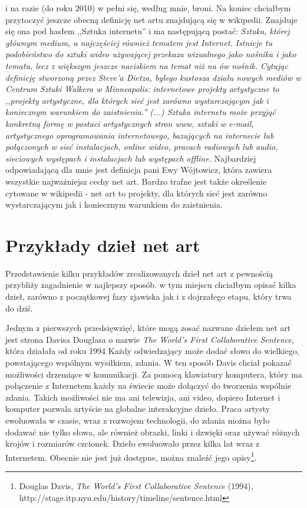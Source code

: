 \documentclass[a4paper,12pt]{article}
\begin{document}
i na razie (do roku 2010) w pełni się, według mnie, broni.
Na koniec chciałbym przytoczyć jeszcze obecną definicję net artu znajdującą
się w wikipedii. Znajduje się ona pod hasłem ,,Sztuka internetu'' i ma
następującą postać: %
\textit{Sztuka, której głównym
medium, a najczęściej również tematem jest Internet. Istnieje tu podobieństwo
do sztuki wideo używającej przekazu wizualnego jako nośnika i jako tematu,
lecz z większym jeszcze naciskiem na temat niż na ów nośnik. Cytując definicję
stworzoną przez Steve'a Dietza, byłego kustosza działu nowych mediów
w Centrum Sztuki Walkera w Minneapolis: internetowe projekty artystyczne
to ,,projekty artystyczne, dla których sieć jest zarówno wystarczającym
jak i koniecznym warunkiem do zaistnienia.'' (...) Sztuka internetu może
przyjąć konkretną formę w postaci artystycznych stron www, sztuki w e-mail,
artystycznego oprogramowania internetowego, bazujących na internecie lub
połączonych w sieć instalacjach, online wideo, pracach radiowych lub audio,
sieciowych występach i instalacjach lub występach offline.}
Najbardziej odpowiadającą dla mnie jest definicja pani Ewy Wójtowicz,
która zawiera wszystkie najważniejsz cechy net art. Bardzo trafne jest
także określenie cytowane w wikipedii - net art to projekty, dla których
sieć jest zarówno wystarczającym jak i koniecznym warunkiem do zaistnienia.

\section{Przykłady dzieł net art}

Przedstawienie kilku przykładów zrealizowanych dzieł net art z pewnością
przybliży zagadnienie w najlepszy sposób. w tym miejscu chciałbym
opisać kilka dzieł, zarówno z początkowej fazy zjawiska jak i z dojrzałego
etapu, który trwa do dziś.

Jednym z pierwszych przedsięwzięć,
które mogą zosać nazwane dziełem net art jest strona Davisa Douglasa
o nazwie \textit{The World's First Collaborative Sentence}, która działała
od roku 1994
Każdy odwiedzający może dodać słowo do wielkiego,
powstającego wspólnym wysiłkiem, zdania. W ten sposób Davis chciał
pokazać możliwości drzemiące w komunikacji. Za pomocą klawiatury
komputera, który ma połączenie z Internetem każdy na świecie może
dołączyć do tworzenia wspólnie zdania. Takich możliwości nie ma
ani telewizja, ani video, dopiero Internet i komputer pozwala artyście
na globalne interakcyjne dzieło. Praca artysty ewoluowała w czasie,
wraz z rozwojem technologii, do zdania można było dodawać nie tylko
słowa, ale również obrazki, linki i dzwięki oraz używać różnych krojów
i rozmiarów czcionek. Dzieło ewoluowało przez kilka lat wraz z Internetem.
Obecnie nie jest już dostępne, można znaleźć jego
opisy\footnote{Douglas Davis, \textit{The World's First Collaborative
Sentence} (1994), http://stage.itp.nyu.edu/history/timeline/sentence.html}.
\end{document}
